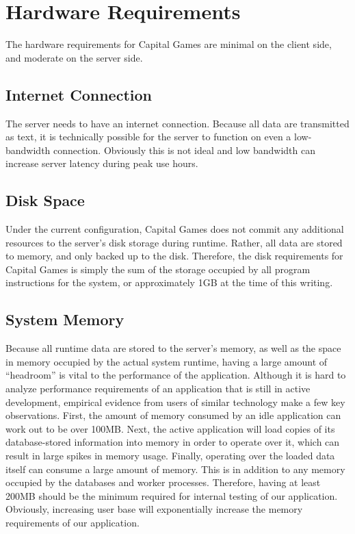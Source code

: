 \section{Hardware Requirements}

The hardware requirements for Capital Games are minimal
on the client side, and moderate on the server side.

\subsection{Internet Connection}

The server needs to have an internet connection. Because
all data are transmitted as text, it is technically possible
for the server to function on even a low-bandwidth connection.
Obviously this is not ideal and low bandwidth can increase
server latency during peak use hours. 

\subsection{Disk Space}

Under the current configuration, Capital Games does not commit
any additional resources to the server's disk storage during
runtime. Rather, all data are stored to memory, and only
backed up to the disk. Therefore, the disk requirements for
Capital Games is simply the sum of the storage occupied by
all program instructions for the system, or approximately
1GB at the time of this writing.

\subsection{System Memory}

Because all runtime data are stored to the server's memory, as
well as the space in memory occupied by the actual system
runtime, having a large amount of ``headroom'' is vital to the
performance of the application. Although it is hard to
analyze performance requirements of an application that is
still in active development, empirical evidence from users of
similar technology make a few key observations. First, the
amount of memory consumed by an idle application can work
out to be over 100MB. Next, the active application will load
copies of its database-stored information into memory in order
to operate over it, which can result in large spikes in memory
usage. Finally, operating over the loaded data itself can 
consume a large amount of memory. This is in addition to any
memory occupied by the databases and worker processes. \cite{so:railsmem}
Therefore, having at least 200MB should be the minimum required
for internal testing of our application. Obviously, increasing
user base will exponentially increase the memory requirements
of our application.

